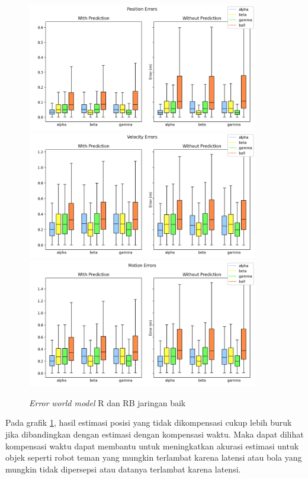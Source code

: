 \begin{figure}[p]
    \centering
    \medskip
    \includegraphics[width=0.9\textwidth]{resources/cfg1_AR_ARB_error_pos.png}
    \includegraphics[width=0.9\textwidth]{resources/cfg1_AR_ARB_error_vel.png}
    \includegraphics[width=0.9\textwidth]{resources/cfg1_AR_ARB_error_motion.png}
    \caption{\textit{Error} \textit{world model} R dan RB jaringan baik}
    \label{fig:1-r-rb-error}
    \bigskip
\end{figure}

Pada grafik \ref{fig:1-r-rb-error}, hasil estimasi posisi yang tidak dikompensasi cukup lebih buruk jika dibandingkan dengan estimasi dengan kompensasi waktu. Maka dapat dilihat kompensasi waktu dapat membantu untuk meningkatkan akurasi estimasi untuk objek seperti robot teman yang mungkin terlambat karena latensi atau bola yang mungkin tidak dipersepsi atau datanya terlambat karena latensi.

